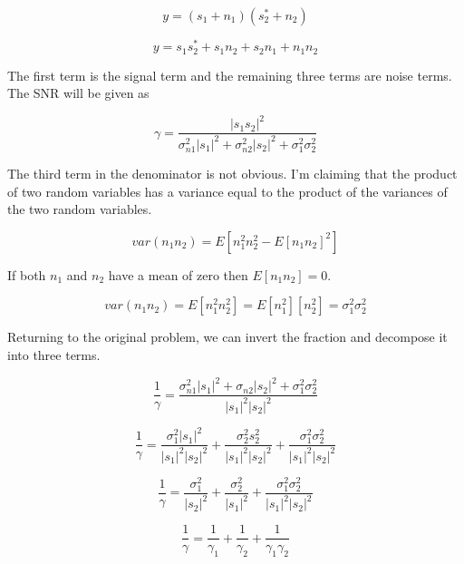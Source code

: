 \documentclass[11pt]{article}
\begin{document}
\begin{equation}
y = (s_1 + n_1)(s_2^* + n_2)
\end{equation}

\begin{equation}
y = s_1 s^*_2 + s_1 n_2 + s_2 n_1 + n_1 n_2
\end{equation}

The first term is the signal term and the remaining three terms are noise terms. The SNR will be given as

\begin{equation}
\gamma = \frac{|s_1 s_2|^2}{\sigma_{n1}^2 |s_1|^2 + \sigma_{n2}^2 |s_2|^2 + \sigma_1^2 \sigma_2^2}
\end{equation}

The third term in the denominator is not obvious. I'm claiming that the product of two random variables has a variance equal to the product of the variances of the two random variables.

\begin{equation}
var (n_1 n_2) = E[n_1^2 n_2^2 - E[n_1 n_2]^2]
\end{equation}

If both $n_1$ and $n_2$ have a mean of zero then $E[n_1 n_2] = 0$.

\begin{equation}
var(n_1 n_2) = E[n_1^2 n_2^2] = E[n_1^2] [n_2^2] = \sigma_1^2\sigma_2^2
\end{equation}

Returning to the original problem, we can invert the fraction and decompose it into three terms.

\begin{equation}
\frac{1}{\gamma}
=
\frac{\sigma_{n1}^2 |s_1|^2 + \sigma_{n2} |s_2|^2 + \sigma_1^2 \sigma_2^2}{|s_1|^2 |s_2|^2}
\end{equation}

\begin{equation}
\frac{1}{\gamma}
=
\frac{\sigma_1^2 |s_1|^2}{|s_1|^2 |s_2|^2}
+
\frac{\sigma^2_2 s_2^2}{|s_1|^2 |s_2|^2}
+
\frac{\sigma_1^2 \sigma_2^2}{|s_1|^2 |s_2|^2}
\end{equation}

\begin{equation}
\frac{1}{\gamma}
=
\frac{\sigma_1^2}{|s_2|^2}
+
\frac{\sigma^2_2}{|s_1|^2}
+
\frac{\sigma_1^2 \sigma^2_2}{|s_1|^2 |s_2|^2}
\end{equation}

\begin{equation}
\boxed{
\frac{1}{\gamma}
=
\frac{1}{\gamma_1}
+
\frac{1}{\gamma_2}
+
\frac{1}{\gamma_1 \gamma_2}
}
\end{equation}
\end{document}
